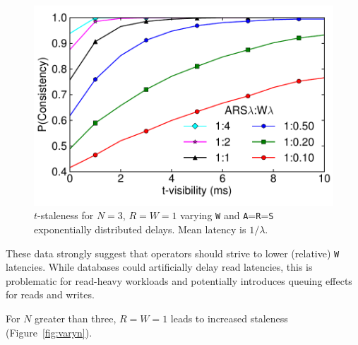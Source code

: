 \documentclass{vldb}
\begin{document}
\begin{figure}
\centering
\includegraphics[width=.85\columnwidth]{figs/rwratio.pdf}
\caption{$t$-staleness for $N$$=$$3$, $R$$=$$W$$=$$1$ varying \texttt{W} and \texttt{A}=\texttt{R}=\texttt{S} exponentially distributed delays.  Mean latency is $1/\lambda$.}
\label{fig:varydelay}
\end{figure}

These data strongly suggest that operators should strive to lower
(relative) \texttt{W} latencies.  While databases could artificially
delay read latencies, this is problematic for read-heavy workloads and
potentially introduces queuing effects for reads and writes.

For $N$ greater than three, $R$$=$$W$$=$$1$ leads to increased
staleness (Figure~\ref{fig:varyn}).  
\end{document}
